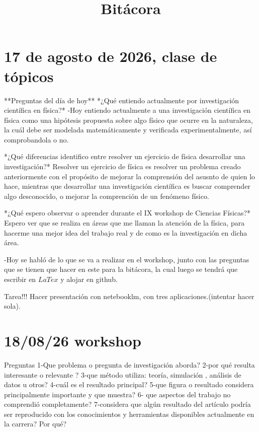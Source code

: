 \documentclass{article}
\title{Bitácora}
\begin{document}
\maketitle

\section{17 de agosto de 2026, clase de tópicos}



**Preguntas del día de hoy**
*¿Qué entiendo actualmente por investigación científica en física?*
-Hoy entiendo actualmente a una investigación científica en física como una hipótesis propuesta sobre algo físico que ocurre en la naturaleza, la cuál debe ser modelada matemáticamente  y  verificada experimentalmente, así comprobandola o no. 

*¿Qué diferencias identifico entre resolver un ejercicio de física  desarrollar una investigación?*
Resolver un ejercicio de física es resolver un problema creado anteriormente con el propósito de mejorar la comprensión del asusnto de quien lo hace, mientras que desarrollar una investigación científica es buscar comprender algo desconocido,  o mejorar la comprención de un fenómeno físico.

*¿Qué espero observar o aprender durante el IX workshop de Ciencias Físicas?*
Espero ver que se realiza en áreas que me llaman la atención de la física, para hacerme una mejor idea del trabajo real y de como es la investigación en dicha área.

-Hoy se habló de lo que se va a realizar en el workshop, junto con las preguntas que se tienen que hacer en este para la bitácora, la cual luego se tendrá que escribir en $LaTex$ y alojar en github.

Tarea!!! Hacer presentación con netebooklm, con tres aplicaciones.(intentar hacer sola).


\section{18/08/26 workshop}

Preguntas
1-Que problema o pregunta de investigación aborda?
2-por qué resulta interesante o relevante ?
3-que método utiliza: teoría, simulación , análisis de datos u otros?
4-cuál es el resultado principal?
5-que figura o resultado considera principalmente importante y que muestra?
6- que aspectos del trabajo no comprendió completamente?
7-considera que algún resultado del artículo podría ser reproducido con los conocimientos y herramientas disponibles actualmente en la carrera? Por qué?
\end{document}

